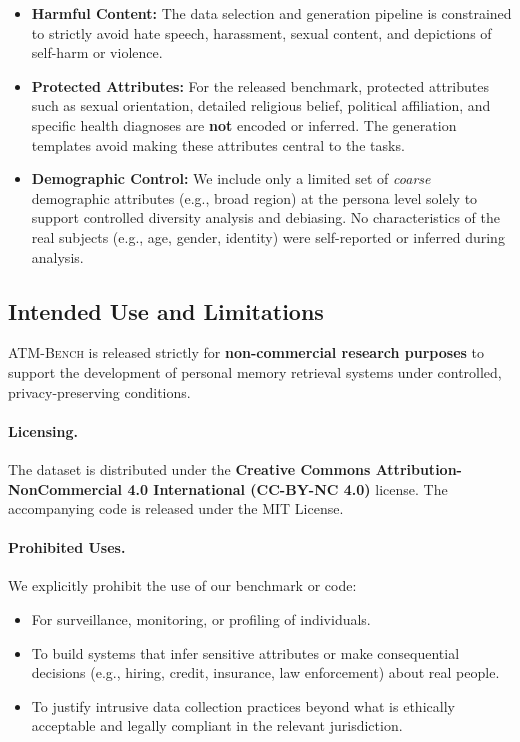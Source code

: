 \documentclass{article}
\theoremstyle{plain}
\theoremstyle{definition}
\theoremstyle{remark}
\begin{document}
\begin{itemize}
    \item \textbf{Harmful Content:} The data selection and generation pipeline is constrained to strictly avoid hate speech, harassment, sexual content, and depictions of self-harm or violence.
    \item \textbf{Protected Attributes:} For the released benchmark, protected attributes such as sexual orientation, detailed religious belief, political affiliation, and specific health diagnoses are \textbf{not} encoded or inferred. The generation templates avoid making these attributes central to the tasks.
    \item \textbf{Demographic Control:} We include only a limited set of \emph{coarse} demographic attributes (e.g., broad region) at the persona level solely to support controlled diversity analysis and debiasing. No characteristics of the real subjects (e.g., age, gender, identity) were self-reported or inferred during analysis.
\end{itemize}

\subsection{Intended Use and Limitations}
\textsc{ATM-Bench} is released strictly for \textbf{non-commercial research purposes} to support the development of personal memory retrieval systems under controlled, privacy-preserving conditions.

\paragraph{Licensing.}
The dataset is distributed under the \textbf{Creative Commons Attribution-NonCommercial 4.0 International (CC-BY-NC 4.0)} license. The accompanying code is released under the MIT License.

\paragraph{Prohibited Uses.}
We explicitly prohibit the use of our benchmark or code:
\begin{itemize}
    \item For surveillance, monitoring, or profiling of individuals.
    \item To build systems that infer sensitive attributes or make consequential decisions (e.g., hiring, credit, insurance, law enforcement) about real people.
    \item To justify intrusive data collection practices beyond what is ethically acceptable and legally compliant in the relevant jurisdiction.
\end{itemize}
\end{document}
